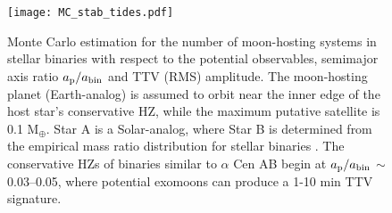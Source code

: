 \documentclass[preprint]{aastex63}
\begin{document}
\begin{figure}
	\texttt{[image: MC\_stab\_tides.pdf]}
    \caption{Monte Carlo estimation for the number of moon-hosting systems in stellar binaries with respect to the potential observables, semimajor axis ratio $a_{\rm p}/a_{\rm bin}$ and TTV {(RMS)} amplitude.  The moon-hosting planet (Earth-analog) is assumed to orbit near the inner edge of the host star's conservative HZ, while the maximum putative satellite is 0.1 M$_\oplus$.  Star A is a Solar-analog, where Star B is determined from the empirical mass ratio distribution for stellar binaries \citep{Moe2017}. The conservative HZs of binaries similar to $\alpha$ Cen AB begin at $a_{\rm p}/a_{\rm bin}$ $\sim$ 0.03--0.05, where potential exomoons can produce a 1-10 min TTV signature.   }
    \label{fig:MC_TTV}
\end{figure}
\end{document}
